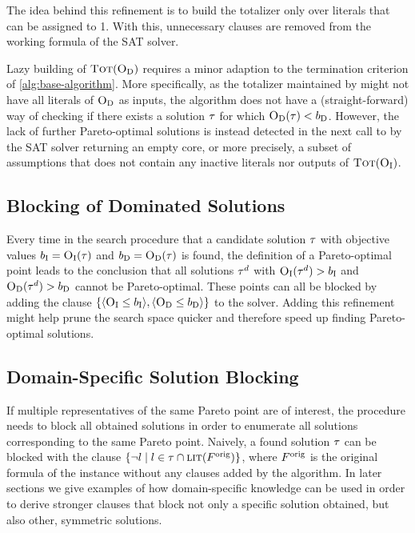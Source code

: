 The idea behind this refinement is to build the totalizer only over literals that can be assigned to 1.
With this, unnecessary clauses are removed from the working formula of the SAT solver.

Lazy building of $\textsc{Tot}(\textsc{O}_{\text{D}})$ requires a minor adaption to the termination criterion of \cref{alg:base-algorithm}.
More specifically, as the totalizer maintained by \Simpr{} might not have all literals of $\textsc{O}_{\text{D}}$ as inputs, the algorithm does not have a (straight-forward) way of checking if there exists a solution $\tau$ for which $\textsc{O}_{\text{D}}(\tau) < b_{\text{D}}$.
However, the lack of further Pareto-optimal solutions is instead detected in the next call to \Min{} by the SAT solver returning an empty core, or more precisely, a subset of assumptions that does not contain any inactive literals nor outputs of $\textsc{Tot}(\textsc{O}_{\text{I}})$.

\subsection{Blocking of Dominated Solutions}

Every time in the search procedure that a candidate solution $\tau$ with objective values $b_{\text{I}} = \textsc{O}_{\text{I}}(\tau)$ and $b_{\text{D}} = \textsc{O}_{\text{D}}(\tau)$ is found, the definition of a Pareto-optimal point leads to the conclusion that all solutions $\tau^d$ with $\textsc{O}_{\text{I}}(\tau^d) > b_{\text{I}}$ and $\textsc{O}_{\text{D}}(\tau^d) > b_{\text{D}}$ cannot be Pareto-optimal.
These points can all be blocked by adding the clause $\{ \langle \textsc{O}_{\text{I}} \leq b_{\text{I}} \rangle, \langle \textsc{O}_{\text{D}} \leq b_{\text{D}} \rangle \}$ to the solver.
Adding this refinement might help prune the search space quicker and therefore speed up finding Pareto-optimal solutions.

\subsection{Domain-Specific Solution Blocking}

If multiple representatives of the same Pareto point are of interest, the procedure \E{} needs to block all obtained solutions in order to enumerate all solutions corresponding to the same Pareto point. 
Naively, a found solution $\tau$ can be blocked with the clause $\{ \lnot l \mid l \in \tau \cap \textsc{lit}(F^\text{orig}) \}$, where $F^\text{orig}$ is the original formula of the instance without any clauses added by the algorithm.
In later sections we give examples of how domain-specific knowledge can be used in order to derive stronger clauses that block not only a specific solution obtained, but also other, symmetric solutions.

